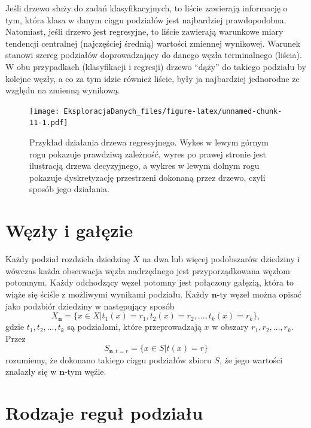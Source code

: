 \documentclass[]{book}
\theoremstyle{plain}
\theoremstyle{definition}
\theoremstyle{definition}
\theoremstyle{definition}
\theoremstyle{definition}
\theoremstyle{remark}
\begin{document}
Jeśli drzewo służy do zadań klasyfikacyjnych, to liście zawierają informację o tym, która klasa w danym ciągu podziałów jest najbardziej prawdopodobna. Natomiast, jeśli drzewo jest regresyjne, to liście zawierają warunkowe miary tendencji centralnej (najczęściej średnią) wartości zmiennej wynikowej. Warunek stanowi szereg podziałów doprowadzający do danego węzła terminalnego (liścia). W obu przypadkach (klasyfikacji i regresji) drzewo ``dąży'' do takiego podziału by kolejne węzły, a co za tym idzie również liście, były ja najbardziej jednorodne ze względu na zmienną wynikową.

\begin{figure}
\centering
\texttt{[image: EksploracjaDanych\_files/figure-latex/unnamed-chunk-11-1.pdf]}
\caption{\label{fig:unnamed-chunk-11}Przykład działania drzewa regresyjnego. Wykes w lewym górnym rogu pokazuje prawdziwą zależność, wyres po prawej stronie jest ilustracją drzewa decyzyjnego, a wykres w lewym dolnym rogu pokazuje dyskretyzację przestrzeni dokonaną przez drzewo, czyli sposób jego działania.}
\end{figure}

\hypertarget{wezy-i-gaezie}{%
\section{Węzły i gałęzie}\label{wezy-i-gaezie}}

Każdy podział rozdziela dziedzinę \(X\) na dwa lub więcej podobszarów dziedziny i wówczas każda obserwacja węzła nadrzędnego jest przyporządkowana węzłom potomnym. Każdy odchodzący węzeł potomny jest połączony gałęzią, która to wiąże się ściśle z możliwymi wynikami podziału. Każdy \(\mathbf{n}\)-ty węzeł można opisać jako podzbiór dziedziny w następujący sposób
\begin{equation}
    X_{\mathbf{n}}=\{x\in X|t_1(x)=r_1,t_2(x)=r_2,\ldots,t_k(x)=r_k\},
\end{equation}
gdzie \(t_1,t_2,\ldots,t_k\) są podziałami, które przeprowadzają \(x\) w obszary \(r_1, r_2,\ldots, r_k\). Przez
\begin{equation}
    S_{\mathbf{n}, t=r}=\{x\in S|t(x)=r\}
\end{equation}
rozumiemy, że dokonano takiego ciągu podziałów zbioru \(S\), że jego wartości znalazły się w \(\mathbf{n}\)-tym węźle.

\hypertarget{rodzaje-regu-podziau}{%
\section{Rodzaje reguł podziału}\label{rodzaje-regu-podziau}}
\end{document}
